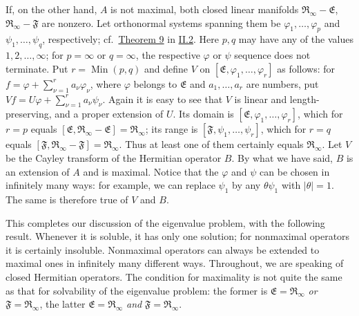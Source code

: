 \documentclass[fontsize=13pt,twoside,openany,headings=normal,parskip=false,bookmarkpackage=false,DIV=calc]{scrbook}
\begin{document}
If, on the other hand, $A$ is not maximal, both closed linear manifolds $\mathfrak R_\infty-\mathfrak E$, $\mathfrak R_\infty-\mathfrak F$ are nonzero. Let orthonormal systems spanning them be $\varphi_1,\ldots,\varphi_p$ and $\psi_1,\ldots,\psi_q$, respectively; cf.\ \hyperref[thm:II.9]{Theorem 9} in \hyperref[sec:II.2]{II.2}. Here $p,q$ may have any of the values $1,2,\ldots,\infty$; for $p=\infty$ or $q=\infty$, the respective $\varphi$ or $\psi$ sequence does not terminate. Put $r=\operatorname{Min}(p,q)$ and define $V$ on $[\mathfrak E,\varphi_1,\ldots,\varphi_r]$ as follows: for $f=\varphi+\sum_{\nu=1}^r a_\nu\varphi_\nu$, where $\varphi$ belongs to $\mathfrak E$ and $a_1,\ldots,a_r$ are numbers, put $Vf=U\varphi+\sum_{\nu=1}^r a_\nu\psi_\nu$. Again it is easy to see that $V$ is linear and length-preserving, and a proper extension of $U$. Its domain is $[\mathfrak E,\varphi_1,\ldots,\varphi_r]$, which for $r=p$ equals $[\mathfrak E,\mathfrak R_\infty-\mathfrak E]=\mathfrak R_\infty$; its range is $[\mathfrak F,\psi_1,\ldots,\psi_r]$, which for $r=q$ equals $[\mathfrak F,\mathfrak R_\infty-\mathfrak F]=\mathfrak R_\infty$. Thus at least one of them certainly equals $\mathfrak R_\infty$. Let $V$ be the Cayley transform of the Hermitian operator $B$. By what we have said, $B$ is an extension of $A$ and is maximal. Notice that the $\varphi$ and $\psi$ can be chosen in infinitely many ways: for example, we can replace $\psi_1$ by any $\theta\psi_1$ with $|\theta|=1$. The same is therefore true of $V$ and $B$.

This completes our discussion of the eigenvalue problem, with the following result. Whenever it is soluble, it has only one solution; for nonmaximal operators it is certainly insoluble. Nonmaximal operators can always be extended to maximal ones in infinitely many different ways. Throughout, we are speaking of closed Hermitian operators. The condition for maximality is not quite the same as that for solvability of the eigenvalue problem: the former is $\mathfrak E=\mathfrak R_\infty$ \emph{or} $\mathfrak F=\mathfrak R_\infty$, the latter $\mathfrak E=\mathfrak R_\infty$ \emph{and} $\mathfrak F=\mathfrak R_\infty$.
\end{document}
